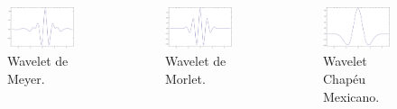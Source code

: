 \begin{frame}[allowframebreaks]
 \begin{columns}[T]
  \begin{figure}[hptb]
  \centering
  \includegraphics[width=.9\textwidth]{images/meyer.pdf}
  \caption{Wavelet de Meyer.}
  \label{fig:meyer}
  \end{figure} 
  \begin{figure}[hptb]
  \centering
  \includegraphics[width=.9\textwidth]{images/morlet.pdf}
  \caption{Wavelet de Morlet.}
  \label{fig:morlet}
  \end{figure} 
  \begin{figure}[hptb]
  \centering
  \includegraphics[width=.9\textwidth]{images/mexicanhat.pdf}
  \caption{Wavelet Chapéu Mexicano.}
  \label{fig:mexicanhat}
  \end{figure} 
 \end{columns}

\end{frame}

